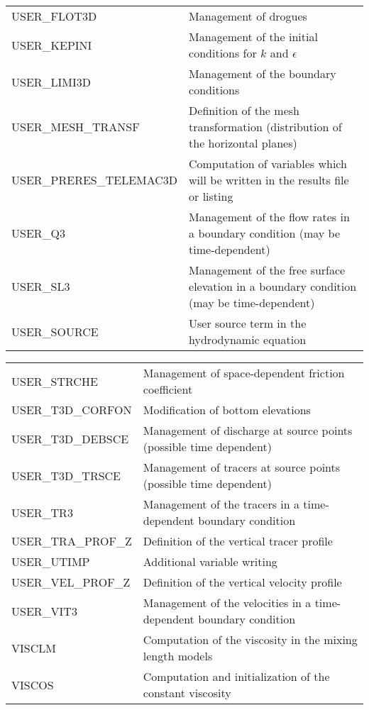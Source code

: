 \begin{tabular}{p{2.5in}p{4.0in}}
USER\_FLOT3D &  Management of drogues\\
USER\_KEPINI &  Management of the initial conditions for $k$ and $\epsilon$\\
USER\_LIMI3D &  Management of the boundary conditions\\
USER\_MESH\_TRANSF &  Definition of the mesh transformation (distribution of the horizontal planes)\\
USER\_PRERES\_TELEMAC3D &  Computation of variables which will be written in the results file or listing\\
USER\_Q3     &  Management of the flow rates in a boundary condition (may be time-dependent)\\
USER\_SL3    &  Management of the free surface elevation in a boundary condition (may be time-dependent)\\
USER\_SOURCE &  User source term in the hydrodynamic equation\\
\end{tabular}
\begin{tabular}{p{2.5in}p{4.0in}}
USER\_STRCHE &  Management of space-dependent friction coefficient\\
USER\_T3D\_CORFON  &  Modification of bottom elevations\\
USER\_T3D\_DEBSCE  &  Management of discharge at source points (possible time dependent)\\
USER\_T3D\_TRSCE  &  Management of tracers at source points (possible time dependent)\\
USER\_TR3    & Management of the tracers in a time-dependent boundary condition\\
USER\_TRA\_PROF\_Z & Definition of the vertical tracer profile\\
USER\_UTIMP  &  Additional variable writing\\
USER\_VEL\_PROF\_Z & Definition of the vertical velocity profile\\
USER\_VIT3   &  Management of the velocities in a time-dependent boundary condition\\
VISCLM  & Computation of the viscosity in the mixing length models\\
VISCOS  &  Computation and initialization of the constant viscosity\\
\end{tabular}
